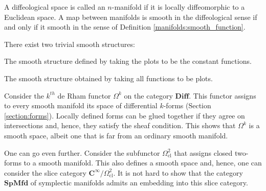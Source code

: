 
    \begin{adefinition}[Manifold]
        A diffeological space is called an $n$-manifold if it is locally diffeomorphic to a Euclidean space. A map between manifolds is smooth in the diffeological sense if and only if it smooth in the sense of Definition \ref{manifolds:smooth_function}.
    \end{adefinition}

    There exist two trivial smooth structures:
    \begin{example}
        The smooth structure defined by taking the plots to be the constant functions.
    \end{example}
    \begin{example}
        The smooth structure obtained by taking all functions to be plots.
    \end{example}


    \begin{example}
        Consider the $k^{th}$ de Rham functor $\Omega^k$ on the category $\mathbf{Diff}$. This functor assigns to every smooth manifold its space of differential $k$-forms (Section \ref{section:forms}). Locally defined forms can be glued together if they agree on intersections and, hence, they satisfy the sheaf condition. This shows that $\Omega^k$ is a smooth space, albeit one that is far from an ordinary smooth manifold.

        One can go even further. Consider the subfunctor $\Omega^2_\mathrm{cl}$ that assigns closed two-forms to a smooth manifold. This also defines a smooth space and, hence, one can consider the slice category $\mathbf{C^\infty}/\Omega^2_\mathrm{cl}$. It is not hard to show that the category $\mathbf{SpMfd}$ of symplectic manifolds admits an embedding into this slice category.
    \end{example}

